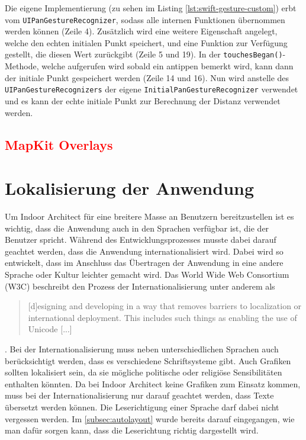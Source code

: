 Die eigene Implementierung (zu sehen im Listing \ref{lst:swift-gesture-custom}) erbt vom \texttt{UIPanGestureRecognizer}, sodass alle internen Funktionen übernommen werden können (Zeile 4).
Zusätzlich wird eine weitere Eigenschaft angelegt, welche den echten initialen Punkt speichert, und eine Funktion zur Verfügung gestellt, die diesen Wert zurückgibt (Zeile 5 und 19).
In der \texttt{touchesBegan()}-Methode, welche aufgerufen wird sobald ein antippen bemerkt wird, kann dann der initiale Punkt gespeichert werden (Zeile 14 und 16).
Nun wird anstelle des \texttt{UIPanGestureRecognizers} der eigene \texttt{InitialPanGestureRecognizer} verwendet und es kann der echte initiale Punkt zur Berechnung der Distanz verwendet werden.

\subsection{\textcolor{red}{MapKit Overlays}}

\section{Lokalisierung der Anwendung}
\label{sec:localizing}
Um Indoor Architect für eine breitere Masse an Benutzern bereitzustellen ist es wichtig, dass die Anwendung auch in den Sprachen verfügbar ist, die der Benutzer spricht.
Während des Entwicklungsprozesses musste dabei darauf geachtet werden, dass die Anwendung internationalisiert wird.
Dabei wird so entwickelt, dass im Anschluss das Übertragen der Anwendung in eine andere Sprache oder Kultur leichter gemacht wird.
Das World Wide Web Consortium (W3C) beschreibt den Prozess der Internationalisierung unter anderem als \blockquote{[d]esigning and developing in a way that removes barriers to localization or international deployment. This includes such things as enabling the use of Unicode [...]} \parencite{ISH2005}.\pbreak%
%
Bei der Internationalisierung muss neben unterschiedlichen Sprachen auch berücksichtigt werden, dass es verschiedene Schriftsysteme gibt.
Auch Grafiken sollten lokalisiert sein, da sie mögliche politische oder religiöse Sensibilitäten enthalten könnten.
Da bei Indoor Architect keine Grafiken zum Einsatz kommen, muss bei der Internationalisierung nur darauf geachtet werden, dass Texte übersetzt werden können.
Die Leserichtigung einer Sprache darf dabei nicht vergessen werden.
Im \autoref{subsec:autolayout} wurde bereits darauf eingegangen, wie man dafür sorgen kann, dass die Leserichtung richtig dargestellt wird.

